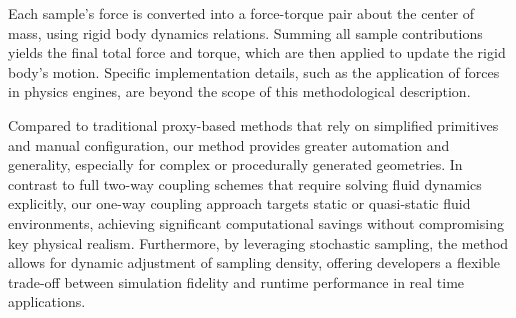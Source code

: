 Each sample's force is converted into a force-torque pair about the center of mass, using rigid body dynamics relations. Summing all sample contributions yields the final total force and torque, which are then applied to update the rigid body's motion. Specific implementation details, such as the application of forces in physics engines, are beyond the scope of this methodological description.

Compared to traditional proxy-based methods that rely on simplified primitives and manual configuration, our method provides greater automation and generality, especially for complex or procedurally generated geometries. In contrast to full two-way coupling schemes that require solving fluid dynamics explicitly, our one-way coupling approach targets static or quasi-static fluid environments, achieving significant computational savings without compromising key physical realism. Furthermore, by leveraging stochastic sampling, the method allows for dynamic adjustment of sampling density, offering developers a flexible trade-off between simulation fidelity and runtime performance in real time applications.

